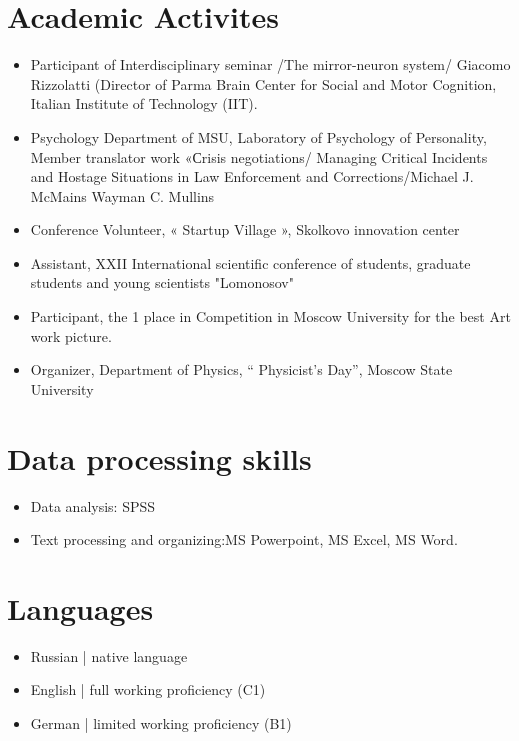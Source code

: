 \documentclass[a4paper,10pt]{article}
\begin{document}
\section*{Academic Activites} 
\begin{itemize}
\item Participant of Interdisciplinary seminar /The mirror-neuron system/ Giacomo Rizzolatti
(Director of Parma Brain Center for Social and Motor Cognition, Italian Institute of Technology (IIT).

\item Psychology Department of MSU, Laboratory of Psychology of Personality, Member translator work «Сrisis negotiations/ Managing Critical Incidents and Hostage Situations in Law Enforcement and Corrections/Michael J. McMains Wayman C. Mullins
\item Conference Volunteer, « Startup Village », Skolkovo innovation center
\item Assistant, XXII International scientific conference of students, graduate students and young scientists "Lomonosov"
\item Participant, the 1 place in Competition in Moscow University for the best Art work picture.
\item Organizer, Department of Physics, “ Physicist’s Day”, Moscow State University 
\end{itemize}
\section*{Data processing skills}
\begin{itemize}
\item Data analysis: SPSS
\item Text processing and organizing:MS Powerpoint, MS Excel, MS Word.
\end{itemize}

\section*{Languages} 
\begin{itemize}
\item Russian | native language
\item English | full working proficiency (C1)
\item German | limited working proficiency (B1)
\end{itemize}
\end{document}
